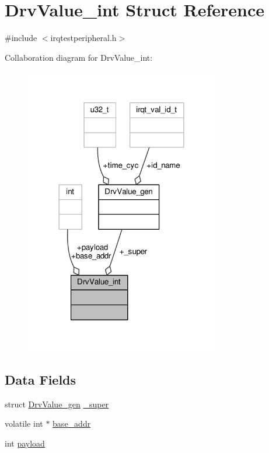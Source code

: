 \hypertarget{struct_drv_value__int}{}\section{Drv\+Value\+\_\+int Struct Reference}
\label{struct_drv_value__int}


{\ttfamily \#include $<$irqtestperipheral.\+h$>$}



Collaboration diagram for Drv\+Value\+\_\+int\+:\nopagebreak
\begin{figure}[H]
\begin{center}
\leavevmode
\includegraphics[width=240pt]{struct_drv_value__int__coll__graph}
\end{center}
\end{figure}
\subsection*{Data Fields}
\begin{DoxyCompactItemize}
\item 
struct \hyperlink{struct_drv_value__gen}{Drv\+Value\+\_\+gen} \hyperlink{struct_drv_value__int_ad6a22febddaa20faa4af2f9fed5766f0}{\+\_\+super}
\item 
volatile int $\ast$ \hyperlink{struct_drv_value__int_ae2918bea8bf855b64182bd166cb8966d}{base\+\_\+addr}
\item 
int \hyperlink{struct_drv_value__int_a86d3b28b783f5b0e9cf208f0461a6f0b}{payload}
\end{DoxyCompactItemize}



